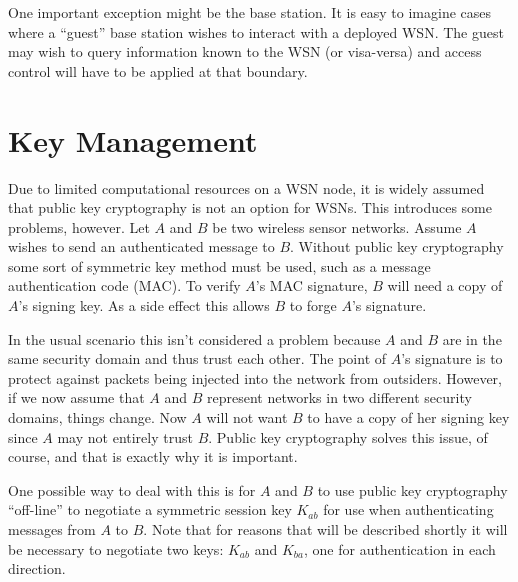 \documentclass{article}
\begin{document}
One important exception might be the base station. It is easy to imagine cases where a ``guest''
base station wishes to interact with a deployed WSN. The guest may wish to query information
known to the WSN (or visa-versa) and access control will have to be applied at that boundary.


\section{Key Management}

Due to limited computational resources on a WSN node, it is widely assumed that public key
cryptography is not an option for WSNs. This introduces some problems, however. Let $A$ and $B$
be two wireless sensor networks. Assume $A$ wishes to send an authenticated message to $B$.
Without public key cryptography some sort of symmetric key method must be used, such as a
message authentication code (MAC). To verify $A$'s MAC signature, $B$ will need a copy of $A$'s
signing key. As a side effect this allows $B$ to forge $A$'s signature.

In the usual scenario this isn't considered a problem because $A$ and $B$ are in the same
security domain and thus trust each other. The point of $A$'s signature is to protect against
packets being injected into the network from outsiders. However, if we now assume that $A$ and
$B$ represent networks in two different security domains, things change. Now $A$ will not want
$B$ to have a copy of her signing key since $A$ may not entirely trust $B$. Public key
cryptography solves this issue, of course, and that is exactly why it is important.

One possible way to deal with this is for $A$ and $B$ to use public key cryptography
``off-line'' to negotiate a symmetric session key $K_{ab}$ for use when authenticating messages
from $A$ to $B$. Note that for reasons that will be described shortly it will be necessary to
negotiate two keys: $K_{ab}$ and $K_{ba}$, one for authentication in each direction.
\end{document}
